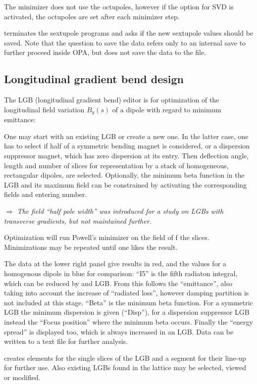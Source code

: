 \documentclass[12pt]{article}
\newcommand\todo[1]{$\Longrightarrow$ {\em #1} }
\newcommand\button[1]{\fbox{\small\bf #1}}
\newcommand\chkbox[1]{\fbox{\small $\circ\,$#1}}
\begin{document}
The minimizer does not use the octupoles, however if the \chkbox{auto} option
for SVD is activated, the octupoles are set after each minimizer step.

\button{Exit} terminates the sextupole programs and asks if the new sextupole values
should be saved. Note that the question to save the
data refers only to an internal save to further proceed inside OPA, but does
not save the data to the file.

\subsection{Longitudinal gradient bend design}
The LGB (longitudinal gradient bend) editor is for optimization of the longitudinal field variation $B_y(s)$ of a dipole with regard to minimum emittance:

One may start with an existing LGB or create a new one. 
In the latter case, one has to select if half of a symmetric bending magnet is considered, or a dispersion suppressor magnet, which has zero dispersion at its entry. 
Then deflection angle, length and number of slices for representation by a stack of homogeneous, rectangular dipoles, are selected. 
Optionally, the minimum beta function in the LGB and its maximum field can be constrained by activating the corresponding fields and entering number.

\todo{The field ``half pole width'' was introduced for a study on LGBs with transverse gradients, but not maintained further.}

Optimization will run Powell's minimizer on the field of f the slices. 
Minimizations may be repeated until one likes the result.

The data at the lower right panel give results in red, and the values for a homogenous dipole in blue for comparison: ``I5'' is the fifth radiaton integral, which can be reduced by and LGB. From this follows the ``emittance'', also taking into account the increase of ``radiated loss'', however damping partition is not included at this stage. ``Beta'' is the minimum beta function. For a symmetric LGB the minimum dispersion is given (``Disp''), for a dispersion suppressor LGB instead the ``Focus position'' where the minimum beta occurs. Finally the ``energy spread'' is displayed too, which is always increased in an LGB. 
Data can be written to a text file for further analysis. 
 
\button{Create new} creates elements for the single slices of the LGB and a segment for their line-up for further use. Also existing LGBs found in the lattice may be selected, viewed or modified.
\end{document}
